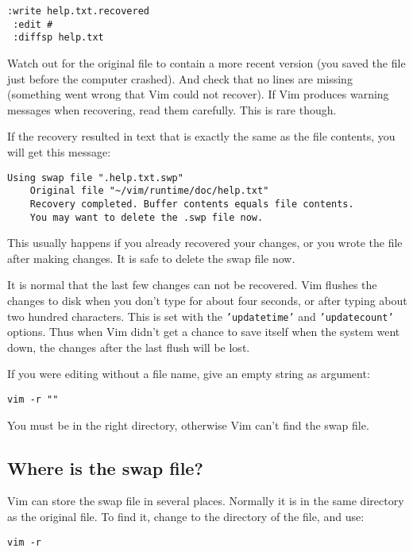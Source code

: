 \begin{Verbatim}[samepage=true]
 :write help.txt.recovered
 :edit #
 :diffsp help.txt
\end{Verbatim}

Watch out for the original file to contain a more recent version (you saved the file just before the computer crashed).
And check that no lines are missing (something went wrong that Vim could not recover).
If Vim produces warning messages when recovering, read them carefully.
This is rare though.

If the recovery resulted in text that is exactly the same as the file contents, you will get this message:

\begin{Verbatim}[samepage=true]
    Using swap file ".help.txt.swp"
    Original file "~/vim/runtime/doc/help.txt"
    Recovery completed. Buffer contents equals file contents.
    You may want to delete the .swp file now.
\end{Verbatim}

This usually happens if you already recovered your changes, or you wrote the file after making changes.
It is safe to delete the swap file now.

It is normal that the last few changes can not be recovered.
Vim flushes the changes to disk when you don't type for about four seconds, or after typing about two hundred characters.
This is set with the \texttt{'updatetime'} and \texttt{'updatecount'} options.
Thus when Vim didn't get a chance to save itself when the system went down, the changes after the last flush will be lost.

If you were editing without a file name, give an empty string as argument:

\begin{Verbatim}[samepage=true]
 vim -r ""
\end{Verbatim}

You must be in the right directory, otherwise Vim can't find the swap file.
\subsection{Where is the swap file?}
Vim can store the swap file in several places.
Normally it is in the same directory as the original file.
To find it, change to the directory of the file, and use:

\begin{Verbatim}[samepage=true]
 vim -r
\end{Verbatim}

